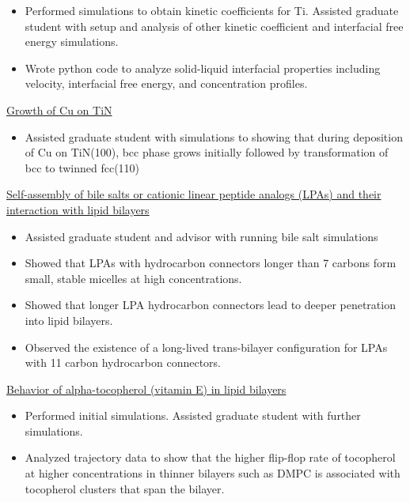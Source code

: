\begin{cventries}
{\begin{cvitems}
            \begin{itemize}
            \item {Performed simulations to obtain kinetic coefficients for Ti. Assisted graduate student with setup and analysis of other kinetic coefficient and interfacial free energy simulations.}
            \item {Wrote python code to analyze solid-liquid interfacial properties including velocity, interfacial free energy, and concentration profiles.}
            \end{itemize}
        \item {\underline{Growth of Cu on TiN}}
            \begin{itemize}
            \item {Assisted graduate student with simulations to showing that during deposition of Cu on TiN(100), bcc phase grows initially followed by transformation of bcc to twinned fcc(110)}
            \end{itemize}
        \item {\underline{Self-assembly of bile salts or cationic linear peptide analogs (LPAs) and their interaction with lipid bilayers}}
            \begin{itemize}
            \item {Assisted graduate student and advisor with running bile salt simulations}
            \item {Showed that LPAs with hydrocarbon connectors longer than 7 carbons form small, stable micelles at high concentrations.}
            \item {Showed that longer LPA hydrocarbon connectors lead to deeper penetration into lipid bilayers.}
            \item {Observed the existence of a long-lived trans-bilayer configuration for LPAs with 11 carbon hydrocarbon connectors.}
            \end{itemize}
        \item {\underline{Behavior of alpha-tocopherol (vitamin E) in lipid bilayers}}
            \begin{itemize}
            \item {Performed initial simulations. Assisted graduate student with further simulations.}
            \item {Analyzed trajectory data to show that the higher flip-flop rate of tocopherol at higher concentrations in thinner bilayers such as DMPC is associated with tocopherol clusters that span the bilayer.}
            \end{itemize}

\end{cvitems}}
\end{cventries}

